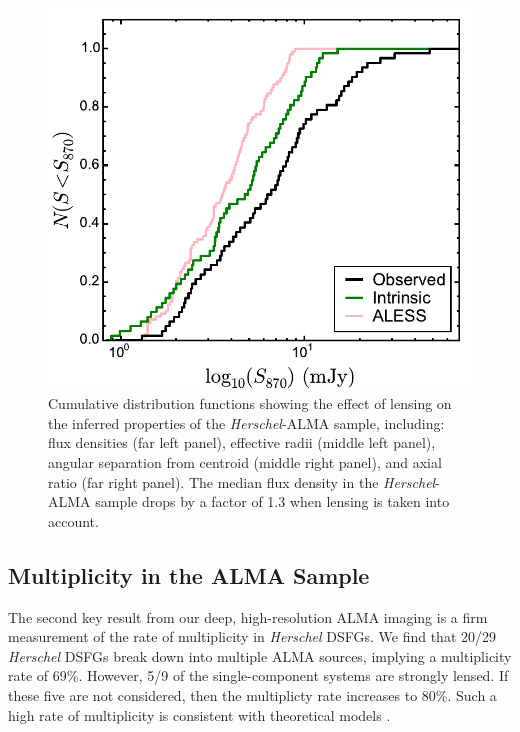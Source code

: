 \documentclass[iop]{emulateapj}
\begin{document}
\begin{figure}[!tbp] 
\includegraphics[width=\linewidth]{f870_delens.pdf}

\caption{ Cumulative distribution functions showing the effect of lensing on
the inferred properties of the {\it Herschel}-ALMA sample, including: flux densities (far left
panel), effective radii (middle left panel), angular separation from centroid
(middle right panel), and axial ratio (far right panel).  The median flux
density in the {\it Herschel}-ALMA sample drops by a factor of 1.3 when lensing is taken into
account.  } \label{fig:delens}

\end{figure}

\subsection{Multiplicity in the ALMA Sample}\label{sec:multiplicity}

The second key result from our deep, high-resolution ALMA imaging is a firm
measurement of the rate of multiplicity in {\it Herschel} DSFGs.  We find that
20/29 {\it Herschel} DSFGs break down into multiple ALMA sources, implying a
multiplicity rate of 69\%.  
However, 5/9 of the single-component
systems are strongly lensed.  If these five are not considered, then the
multiplicty rate increases to 80\%.  Such a high rate of multiplicity is
consistent with theoretical models \citep[e.g.,][]{HN13, HB13}.
\end{document}
